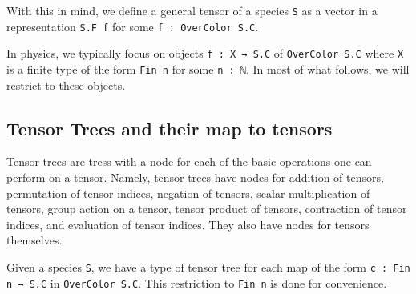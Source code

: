 \documentclass[a4paper, 11pt]{article}
\DeclareRobustCommand{\myinline}{\lstinline}
\begin{document}
With this in mind, we define a general tensor of a species \myinline|S| as a vector in a representation 
\myinline|S.F f| for some \myinline|f : OverColor S.C|. 

In physics, we typically focus on objects \myinline|f : X → S.C| of \myinline|OverColor S.C|  where \myinline|X| is a 
finite type of the form \myinline|Fin n| for some \myinline|n : ℕ|. In most of what follows, 
we will restrict to these objects.

\subsection{Tensor Trees and their map to tensors}

Tensor trees are tress with a node for each of the basic operations one can perform on a tensor. 
Namely, tensor trees have nodes for addition of tensors, permutation of tensor indices, negation of tensors, 
  scalar multiplication of tensors, group action on a tensor, tensor product of tensors, contraction of tensor indices,
  and evaluation of tensor indices.
They also have nodes for tensors themselves.

Given a species \myinline|S|, we have a type of tensor tree for each map of the form
\myinline|c : Fin n → S.C| in \myinline|OverColor S.C|. 
This restriction to \myinline|Fin n| is done for convenience.
\end{document}
